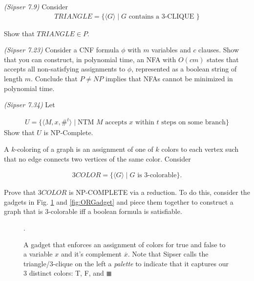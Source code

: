 \documentclass{exam}
\theoremstyle{definition}
\begin{document}
\begin{questions}
    \question \textit{(Sipser 7.9)} Consider 
    \begin{align*}
        TRIANGLE = \{\langle G \rangle \mid G \text{ contains a 3-CLIQUE }\}
    \end{align*}

    Show that $TRIANGLE \in P$. 

    \question \textit{(Sipser 7.23)} Consider a CNF formula $\phi$ with $m$ variables and $c$ clauses. Show that you can construct, in polynomial time,  an NFA with $O(cm)$ states that accepts all non-satisfying assignments to $\phi$, represented as a boolean string of length $m$. Conclude that $P \neq NP$ implies that NFAs cannot be minimized in polynomial time. 

    \question \textit{(Sipser 7.34)} Let 

    \begin{align*}
        U = \{\langle M, x, \#^t \rangle \mid \text{NTM $M$ accepts $x$ within $t$ steps on some branch} \}
    \end{align*}
    Show that $U$ is NP-Complete.  

    \question A $k$-coloring of a graph is an assignment of one of $k$ colors to each vertex such that no edge connects two vertices of the same color. Consider

    \begin{align*}
        3COLOR = \{\langle G \rangle \mid G \text{ is 3-colorable} \}.
    \end{align*}

    Prove that $3COLOR$ is NP-COMPLETE via a reduction. To do this, consider the gadgets in Fig. \ref{fig:TFGadget} and \ref{fig:ORGadget} and piece them together to construct a graph that is 3-colorable iff a boolean formula is satisfiable. 

    \begin{figure}
        \centering
        \caption{A gadget that enforces an assignment of colors for true and false to a variable $x$ and it's complement $\overline{x}$. Note that Sipser calls the triangle/3-clique on the left a \textit{palette} to indicate that it captures our 3 distinct colors: T, F, and \textcolor{gray}{$\blacksquare$}}.
        \label{fig:TFGadget}
    \end{figure}


\end{questions}
\end{document}
